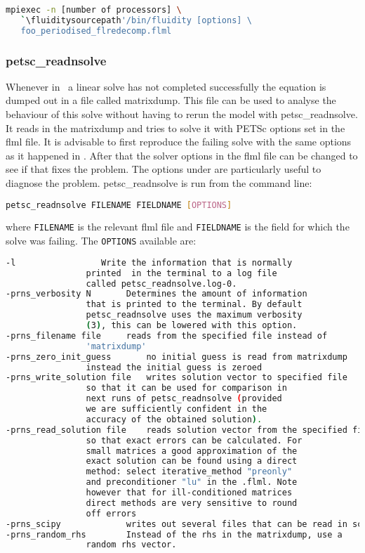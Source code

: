 \begin{lstlisting}[language=bash]
mpiexec -n [number of processors] \
   `\fluiditysourcepath'/bin/fluidity [options] \
   foo_periodised_flredecomp.flml
\end{lstlisting}



\subsubsection{petsc\_readnsolve}
\label{sec:petsc_readnsolve} 
Whenever in \fluidity\ a linear solve has not completed successfully the equation is dumped out in a file called matrixdump. This file can be used to analyse the behaviour of this solve without having to rerun the model with petsc\_readnsolve. It reads in the matrixdump and tries to solve it with PETSc options set in the flml file. It is advisable to first reproduce the failing solve with the same options as it happened in \fluidity. After that the solver options in the flml file can be changed to see if that fixes the problem. The options under  are particularly useful to diagnose the problem.  petsc\_readnsolve is run from the command line:

\begin{lstlisting}[language = Bash]
petsc_readnsolve FILENAME FIELDNAME [OPTIONS]
\end{lstlisting}
where \lstinline[language = Bash]+FILENAME+ is the relevant flml file and \lstinline[language = Bash]+FIELDNAME+ is the field for which the solve was failing. The \lstinline[language = Bash]+OPTIONS+ available are:
\begin{lstlisting}[language = Bash]
 -l 	 			Write the information that is normally
				printed  in the terminal to a log file 
				called petsc_readnsolve.log-0.
-prns_verbosity N 	 	Determines the amount of information 
				that is printed to the terminal. By default 
				petsc_readnsolve uses the maximum verbosity 
				(3), this can be lowered with this option. 
-prns_filename file		reads from the specified file instead of 
				'matrixdump'
-prns_zero_init_guess 		no initial guess is read from matrixdump 
				instead the initial guess is zeroed
-prns_write_solution file 	writes solution vector to specified file 
				so that it can be used for comparison in 
				next runs of petsc_readnsolve (provided 
				we are sufficiently confident in the 
				accuracy of the obtained solution).
-prns_read_solution file 	reads solution vector from the specified file,
				so that exact errors can be calculated. For 
				small matrices a good approximation of the  
				exact solution can be found using a direct 
				method: select iterative_method "preonly" 
				and preconditioner "lu" in the .flml. Note 
				however that for ill-conditioned matrices 
				direct methods are very sensitive to round 
				off errors
-prns_scipy 			writes out several files that can be read in scipy.
-prns_random_rhs 	 	Instead of the rhs in the matrixdump, use a 
				random rhs vector.
\end{lstlisting} 

